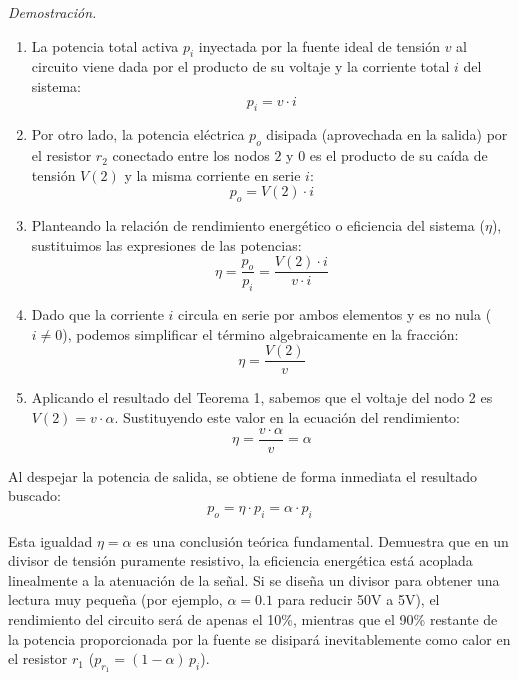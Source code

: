 \documentclass[11pt, a4paper]{article}
\theoremstyle{definition}
\theoremstyle{plain}
\theoremstyle{plain}
\theoremstyle{remark}
\theoremstyle{remark}
\theoremstyle{remark}
\begin{document}
\vspace{0.2cm}
\textit{Demostración.}
\begin{enumerate}
	\item La potencia total activa $p_i$ inyectada por la fuente ideal de tensión $v$ al circuito viene dada por el producto de su voltaje y la corriente total $i$ del sistema:
	\begin{equation*}
		p_i = v \cdot i
	\end{equation*}
	
	\item Por otro lado, la potencia eléctrica $p_o$ disipada (aprovechada en la salida) por el resistor $r_2$ conectado entre los nodos $2$ y $0$ es el producto de su caída de tensión $V(2)$ y la misma corriente en serie $i$:
	\begin{equation*}
		p_o = V(2) \cdot i
	\end{equation*}
	
	\item Planteando la relación de rendimiento energético o eficiencia del sistema ($\eta$), sustituimos las expresiones de las potencias:
	\begin{equation*}
		\eta = \frac{p_o}{p_i} = \frac{V(2) \cdot i}{v \cdot i}
	\end{equation*}
	
	\item Dado que la corriente $i$ circula en serie por ambos elementos y es no nula ($i \neq 0$), podemos simplificar el término algebraicamente en la fracción:
	\begin{equation*}
		\eta = \frac{V(2)}{v}
	\end{equation*}
	
	\item Aplicando el resultado del Teorema 1, sabemos que el voltaje del nodo 2 es $V(2) = v \cdot \alpha$. Sustituyendo este valor en la ecuación del rendimiento:
	\begin{equation*}
		\eta = \frac{v \cdot \alpha}{v} = \alpha
	\end{equation*}
\end{enumerate}
Al despejar la potencia de salida, se obtiene de forma inmediata el resultado buscado:
\begin{equation*}
	p_o = \eta \cdot p_i = \alpha \cdot p_i \tag*{\(\square\)}
\end{equation*}

Esta igualdad \(\eta = \alpha\) es una conclusión teórica fundamental. Demuestra que en un divisor de tensión puramente resistivo, la eficiencia energética está acoplada linealmente a la atenuación de la señal. Si se diseña un divisor para obtener una lectura muy pequeña (por ejemplo,
$\alpha=0.1$ para reducir 50V a 5V), el rendimiento del circuito será de apenas el 10\%, mientras que el 90\% restante de la potencia proporcionada por la fuente se disipará inevitablemente como calor en el resistor $r_1$ ($p_{r_1} = (1-\alpha)\,p_i$).
\end{document}
